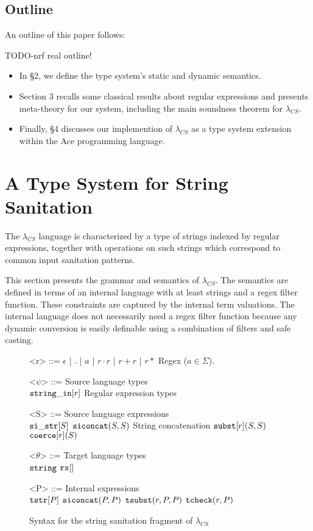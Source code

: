 \documentclass[10pt,preprint]{sigplanconf}
\theoremstyle{definition}
\newcommand{\sisubst}[3]{{\tt subst}[#1](#2,#3)}
\newcommand{\coerce}[2]{ {\tt coerce}[#1](#2)}
\newcommand{\sistr}[1]{{\tt si\_str}[#1]}
\newcommand{\strin}[1]{\sistr{#1}}
\newcommand{\siconcat}[2]{{\tt siconcat}(#1,#2)}
\newcommand{\stringin}[1]{{\tt string\_in}[#1]}
\newcommand{\tsubst}[3]{{\tt tsubst}(#1,#2,#3)}
\newcommand{\tcheck}[2]{{\tt tcheck}(#1, #2)}
\renewcommand{\tstr}[1]{{{\tt tstr}[#1]}}
\newcommand{\str}{{\tt string}}
\newcommand{\regext}[1]{ {\tt rx}[#1] }
\newcommand{\lcs}{\lambda_{CS}}
\begin{document}
\subsection{Outline}

An outline of this paper follows:

TODO-nrf real outline!
\begin{itemize}
  \item In \S 2, we define the type system's static and dynamic semantics.
  \item Section 3 recalls some classical results about regular expressions and presents meta-theory for our system, including
    the main soundness theorem for $\lcs$.
  \item Finally, \S 4 discusses our implemention of $\lcs$ as a type system extension  within the Ace programming language.
\end{itemize}

\section{A Type System for String Sanitation}

The $\lcs$ language is characterized by a type of strings indexed by regular
expressions, together with operations on such strings which correspond to common
input sanitation patterns.

This section presents the grammar and semantics of $\lcs$.
The semantics are defined in terms of an internal language with at least strings and a regex filter function.
These constraints are captured by the internal term valuations.
The internal language does not necessarily need a regex filter function because
any dynamic conversion is easily definable using a combination of filters and safe
casting.
%
%

\renewcommand{\grammarlabel}[2]{#1\hfill#2}

\begin{figure}
\begin{grammar}
<r> ::= $\epsilon$ | $.$ | $a$ | $r \cdot r$ | $r + r$ | $r*$ \hfill Regex ($a \in \Sigma$).

<$\psi$> ::=				\hfill	Source language types					\\
$\stringin{r}$				\hfill Regular expression types \alt

<S> ::= \hfill Source language expressions \\
      $\strin{S}$ \alt
      $\siconcat{S}{S}$ \hfill String concatenation \alt
      $\sisubst{r}{S}{S}$ \alt
      $\coerce{r}{S}$

<$\theta$> ::= \hfill Target language types \\
$\str$ \alt $\regext$

<P> ::= \hfill Internal expressions \\
  $\tstr{P}$ \alt
  $\siconcat{P}{P}$ \alt
  $\tsubst{r}{P}{P}$ \alt
  $\tcheck{r}{P}$
\end{grammar}
\caption{Syntax for the string sanitation fragment of $\lcs$}
\label{fig:lcsSyntax}
\end{figure}
\end{document}
